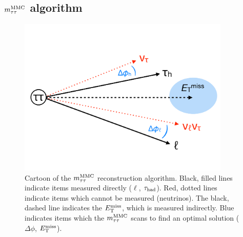 \subsection{$m_{\tau\tau}^\text{MMC}$ algorithm}
\label{sec:strategy-mtautau-mMMC}

\begin{figure}[tp]
  \centering
  \includegraphics[width=0.90\textwidth]{figures/mtautau/mmc-cartoon}
  \caption{Cartoon of the $m_{\tau\tau}^\text{MMC}$ reconstruction algorithm. Black, filled lines indicate items measured directly ($\ell$, $\tau_\text{had}$). Red, dotted lines indicate items which cannot be measured (neutrinos). The black, dashed line indicates the $E_{\mathrm{T}}^{\mathrm{miss}}$, which is measured indirectly. Blue indicates items which the $m_{\tau\tau}^\text{MMC}$ scans to find an optimal solution ($\Delta\phi$, $E_{\mathrm{T}}^{\mathrm{miss}}$).}
  \label{fig:strategy-mtautau-cartoon}
\end{figure}

